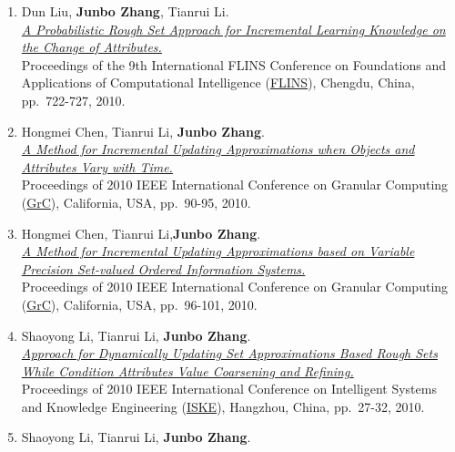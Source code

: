 \documentclass[]{article}
\begin{document}
\begin{enumerate}
{  Computing}. Proceedings of the 9th International FLINS Conference on
  Foundations and Applications of Computational Intelligence
  (\href{http://www.wikicfp.com/cfp/servlet/event.showcfp?eventid=7359\&copyownerid=2}{FLINS}),
  Chengdu, China, pp.~764-769, 2010.
\item
  Dun Liu, \textbf{Junbo Zhang}, Tianrui Li.\\
  \href{http://dx.doi.org/10.1142/9789814324700_0109}{\emph{A
  Probabilistic Rough Set Approach for Incremental Learning Knowledge on
  the Change of Attributes.}}\\ Proceedings of the 9th International
  FLINS Conference on Foundations and Applications of Computational
  Intelligence
  (\href{http://www.wikicfp.com/cfp/servlet/event.showcfp?eventid=7359\&copyownerid=2}{FLINS}),
  Chengdu, China, pp.~722-727, 2010.
\item
  Hongmei Chen, Tianrui Li, \textbf{Junbo Zhang}.\\
  \href{http://dx.doi.org/10.1109/GrC.2010.116}{\emph{A Method for
  Incremental Updating Approximations when Objects and Attributes Vary
  with Time.}}\\ Proceedings of 2010 IEEE International Conference on
  Granular Computing
  (\href{http://xanadu.cs.sjsu.edu/~grc/grc2010}{GrC}), California, USA,
  pp.~90-95, 2010.
\item
  Hongmei Chen, Tianrui Li,\textbf{Junbo Zhang}.\\
  \href{http://dx.doi.org/10.1109/GrC.2010.115}{\emph{A Method for
  Incremental Updating Approximations based on Variable Precision
  Set-valued Ordered Information Systems.}}\\ Proceedings of 2010 IEEE
  International Conference on Granular Computing
  (\href{http://xanadu.cs.sjsu.edu/~grc/grc2010}{GrC}), California, USA,
  pp.~96-101, 2010.
\item
  Shaoyong Li, Tianrui Li, \textbf{Junbo Zhang}.\\
  \href{http://dx.doi.org/10.1109/ISKE.2010.5680788}{\emph{Approach for
  Dynamically Updating Set Approximations Based Rough Sets While
  Condition Attributes Value Coarsening and Refining.}}\\ Proceedings of
  2010 IEEE International Conference on Intelligent Systems and
  Knowledge Engineering
  (\href{http://ieeexplore.ieee.org/xpl/mostRecentIssue.jsp?punumber=5676709}{ISKE}),
  Hangzhou, China, pp.~27-32, 2010.
\item
  Shaoyong Li, Tianrui Li, \textbf{Junbo Zhang}.\\

\end{enumerate}
\end{document}
